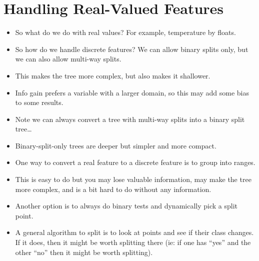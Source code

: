 \documentclass{article}
\begin{document}
\section{Handling Real-Valued Features}
\begin{itemize}
    \item So what do we do with real values?  For example, temperature by floats.
    \item So how do we handle discrete features?  We can allow binary splits only, but we can also allow multi-way splits.
    \item This makes the tree more complex, but also makes it shallower.
    \item Info gain prefers a variable with a larger domain, so this may add some bias to some results.
    \item Note we can always convert a tree with multi-way splits into a binary split tree\dots
    \item Binary-split-only trees are deeper but simpler and more compact.
    \item One way to convert a real feature to a discrete feature is to group into ranges.
    \item This is easy to do but you may lose valuable information, may make the tree more complex, and is a bit hard to do without any information.
    \item Another option is to always do binary tests and dynamically pick a split point.
    \item A general algorithm to split is to look at points and see if their class changes.  If it does, then it might be worth splitting there (ie: if one has ``yes'' and the other ``no'' then it might be worth splitting).
\end{itemize}
\end{document}
